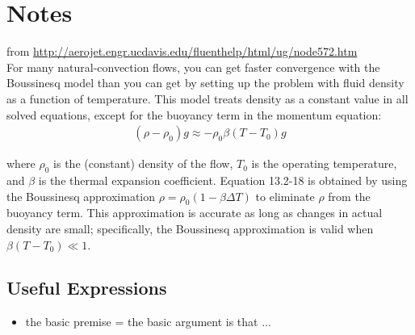 \chapter{Notes}

from \url{http://aerojet.engr.ucdavis.edu/fluenthelp/html/ug/node572.htm} \\

For many natural-convection flows, you can get faster convergence with the Boussinesq model than 
you can get by setting up the problem with fluid density as a function of temperature. This model 
treats density as a constant value in all solved equations, except for the buoyancy term in the momentum 
equation:
\begin{align}
 (\rho - \rho_0) g \approx -\rho_0 \beta (T - T_0) g 	
\end{align}

where  $\rho_0$ is the (constant) density of the flow,  $T_0$ is the operating temperature, and  $\beta$ is 
the thermal expansion coefficient. Equation  13.2-18 is obtained by using the Boussinesq approximation  
$\rho = \rho_0 (1 - \beta \Delta T)$ to eliminate  $\rho$ from the buoyancy term. This approximation is accurate as 
long as changes in actual density are small; specifically, the Boussinesq approximation is valid when  $\beta(T-T_0)\ll 1$.


\section{Useful Expressions}
\begin{itemize}
\item  the basic premise = the basic argument is that ...
\end{itemize}
